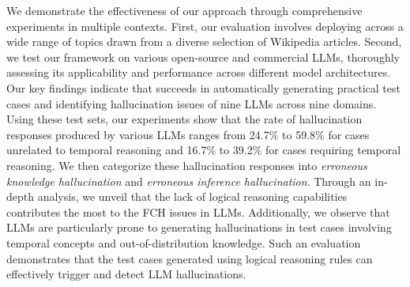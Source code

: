 We demonstrate the effectiveness of our approach through comprehensive experiments in multiple contexts. First, our evaluation involves deploying \tool across a wide range of topics drawn from a diverse selection of Wikipedia articles. Second, we test our framework on various open-source and commercial LLMs, thoroughly assessing its applicability and performance across different model architectures. 
Our key findings indicate that \tool succeeds in automatically generating practical test cases and identifying hallucination issues of nine LLMs across nine domains. 
Using these test sets, our experiments show that the rate of hallucination responses produced by various LLMs ranges from 24.7\% to 59.8\% for cases unrelated to temporal reasoning and 16.7\% to 39.2\% for cases requiring temporal reasoning. 
We then categorize these hallucination responses into \emph{erroneous knowledge hallucination} and \emph{erroneous inference hallucination}. 
Through an in-depth analysis, we unveil that the lack of logical reasoning capabilities contributes the most to the FCH issues in LLMs. 
Additionally, we observe that LLMs are particularly prone to generating hallucinations in test cases involving temporal concepts and out-of-distribution knowledge. 
Such an evaluation demonstrates that the 
test cases generated using %
logical reasoning rules can effectively trigger and detect LLM hallucinations.  %


